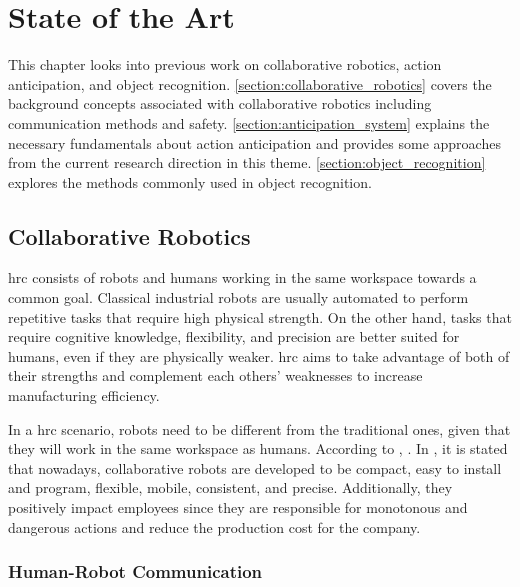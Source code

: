 \chapter{State of the Art}
\label{chapter:state_of_the_art}

This chapter looks into previous work on collaborative robotics, action anticipation, and object recognition. \autoref{section:collaborative_robotics} covers the background concepts associated with collaborative robotics including communication methods and safety. \autoref{section:anticipation_system} explains the necessary fundamentals about action anticipation and provides some approaches from the current research direction in this theme. \autoref{section:object_recognition} explores the methods commonly used in object recognition.

\section{Collaborative Robotics}
\label{section:collaborative_robotics}

\acf{hrc} consists of robots and humans working in the same workspace towards a common goal. Classical industrial robots are usually automated to perform repetitive tasks that require high physical strength. On the other hand, tasks that require cognitive knowledge, flexibility, and precision are better suited for humans, even if they are physically weaker. \acs{hrc} aims to take advantage of both of their strengths and complement each others' weaknesses to increase manufacturing efficiency.

In a \acs{hrc} scenario, robots need to be different from the traditional ones, given that they will work in the same workspace as humans. According to \textcite{Castro2021}, . In \cite{CobotsWW}, it is stated that nowadays, collaborative robots are developed to be compact, easy to install and program, flexible, mobile, consistent, and precise. Additionally, they positively impact employees since they are responsible for monotonous and dangerous actions and reduce the production cost for the company.

\subsection{Human-Robot Communication}

